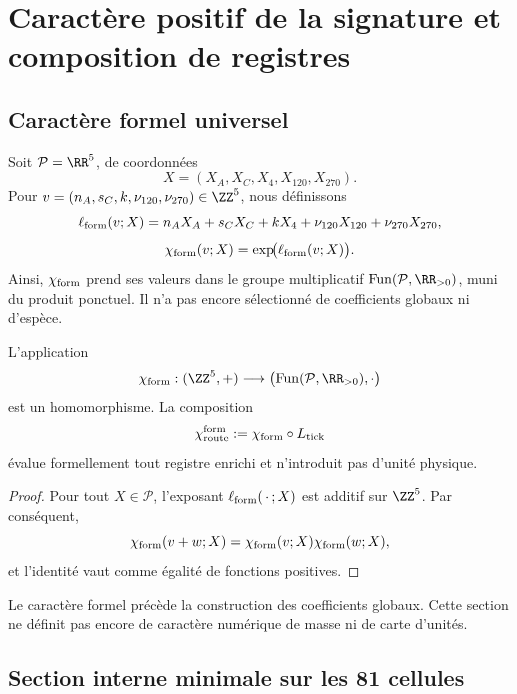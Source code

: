 \chapter{Caractère positif de la signature et composition de registres}
\section{Caractère formel universel}

Soit \(\mathcal P=\RR^5\), de coordonnées
\[
 X=(X_A,X_C,X_4,X_{120},X_{270}).
\]
Pour \(v=(n_A,s_C,k,\nu_{120},\nu_{270})\in\ZZ^5\), nous définissons
\[
 \ell_{\rm form}(v;X)
 =n_AX_A+s_CX_C+kX_4
  +\nu_{120}X_{120}+\nu_{270}X_{270},
\]
\[
 \chi_{\rm form}(v;X)=\exp\!\bigl(\ell_{\rm form}(v;X)\bigr).
\]
Ainsi, \(\chi_{\rm form}\) prend ses valeurs dans le groupe multiplicatif
\(\operatorname{Fun}(\mathcal P,\RR_{>0})\), muni du produit ponctuel. Il n'a pas encore
sélectionné de coefficients globaux ni d'espèce.

\begin{theorem}
\label{thm:caracter-formal-ruta}
L'application
\[
 \chi_{\rm form}:(\ZZ^5,+)\longrightarrow
 \bigl(\operatorname{Fun}(\mathcal P,\RR_{>0}),\cdot\bigr)
\]
est un homomorphisme. La composition
\[
 \chi_{\rm route}^{\rm form}
 :=\chi_{\rm form}\circ L_{\rm tick}
\]
évalue formellement tout registre enrichi et n'introduit pas d'unité
physique.
\end{theorem}

\begin{proof}
Pour tout \(X\in\mathcal P\), l'exposant
\(\ell_{\rm form}(\,\cdot\,;X)\) est additif sur \(\ZZ^5\). Par conséquent,
\[
\chi_{\rm form}(v+w;X)
=\chi_{\rm form}(v;X)\chi_{\rm form}(w;X),
\]
et l'identité vaut comme égalité de fonctions positives.
\end{proof}

Le caractère formel précède la construction des coefficients globaux.
Cette section ne définit pas encore de caractère numérique de masse ni de
carte d'unités.

\section{Section interne minimale sur les 81 cellules}

